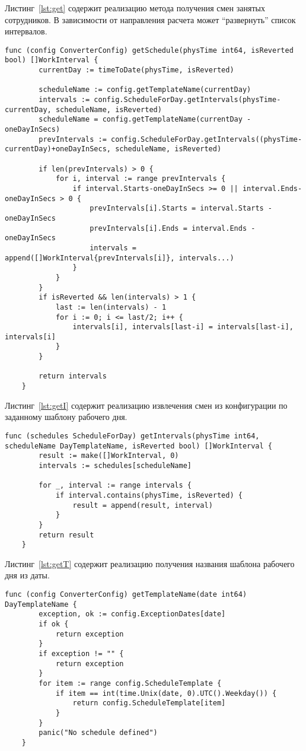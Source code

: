 Листинг~\ref{lst:get} содержит реализацию метода получения смен занятых сотрудников. В зависимости от направления расчета может ``развернуть'' список интервалов.

\begin{lstlisting}[language=Golang,caption={Метод получения расписания смен занятых сотрудников},label=lst:get]
	func (config ConverterConfig) getSchedule(physTime int64, isReverted bool) []WorkInterval {
		currentDay := timeToDate(physTime, isReverted)
	
		scheduleName := config.getTemplateName(currentDay)
		intervals := config.ScheduleForDay.getIntervals(physTime-currentDay, scheduleName, isReverted)
		scheduleName = config.getTemplateName(currentDay - oneDayInSecs)
		prevIntervals := config.ScheduleForDay.getIntervals((physTime-currentDay)+oneDayInSecs, scheduleName, isReverted)
	
		if len(prevIntervals) > 0 {
			for i, interval := range prevIntervals {
				if interval.Starts-oneDayInSecs >= 0 || interval.Ends-oneDayInSecs > 0 {
					prevIntervals[i].Starts = interval.Starts - oneDayInSecs
					prevIntervals[i].Ends = interval.Ends - oneDayInSecs
					intervals = append([]WorkInterval{prevIntervals[i]}, intervals...)
				}
			}
		}
		if isReverted && len(intervals) > 1 {
			last := len(intervals) - 1
			for i := 0; i <= last/2; i++ {
				intervals[i], intervals[last-i] = intervals[last-i], intervals[i]
			}
		}
	
		return intervals
	}
\end{lstlisting}

Листинг~\ref{lst:getI} содержит реализацию извлечения смен из конфигурации по заданному шаблону рабочего дня.

\begin{lstlisting}[language=Golang,caption={Извлечение смен из конфигурации по заданному шаблону},label=lst:getI]
	func (schedules ScheduleForDay) getIntervals(physTime int64, scheduleName DayTemplateName, isReverted bool) []WorkInterval {
		result := make([]WorkInterval, 0)
		intervals := schedules[scheduleName]
	
		for _, interval := range intervals {
			if interval.contains(physTime, isReverted) {
				result = append(result, interval)
			}
		}
		return result
	}
\end{lstlisting}

Листинг~\ref{lst:getT} содержит реализацию получения названия шаблона рабочего дня из даты.

\begin{lstlisting}[language=Golang,caption={Получение названия шаблона рабочего дня из даты},label=lst:getT]
	func (config ConverterConfig) getTemplateName(date int64) DayTemplateName {
		exception, ok := config.ExceptionDates[date]
		if ok {
			return exception
		}
		if exception != "" {
			return exception
		}
		for item := range config.ScheduleTemplate {
			if item == int(time.Unix(date, 0).UTC().Weekday()) {
				return config.ScheduleTemplate[item]
			}
		}
		panic("No schedule defined")
	}
\end{lstlisting}